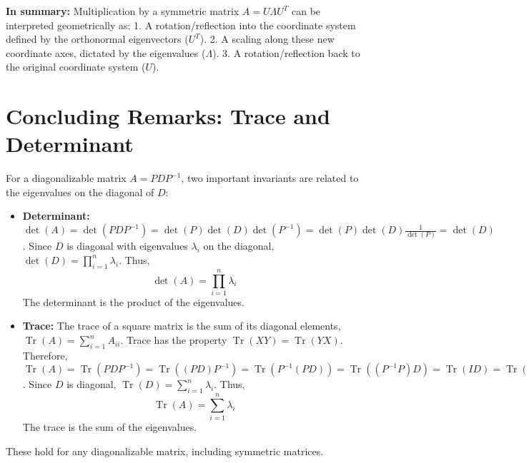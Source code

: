 \documentclass[11pt]{article}
\theoremstyle{definition}
\theoremstyle{remark}
\DeclareMathOperator{\Tr}{Tr}
\begin{document}
\textbf{In summary:} Multiplication by a symmetric matrix $A=U\Lambda U^T$ can be interpreted geometrically as:
1.  A rotation/reflection into the coordinate system defined by the orthonormal eigenvectors ($U^T$).
2.  A scaling along these new coordinate axes, dictated by the eigenvalues ($\Lambda$).
3.  A rotation/reflection back to the original coordinate system ($U$).

\section{Concluding Remarks: Trace and Determinant}

For a diagonalizable matrix $A = P D P^{-1}$, two important invariants are related to the eigenvalues on the diagonal of $D$:

\begin{itemize}
    \item \textbf{Determinant:} $\det(A) = \det(P D P^{-1}) = \det(P) \det(D) \det(P^{-1}) = \det(P) \det(D) \frac{1}{\det(P)} = \det(D)$. Since $D$ is diagonal with eigenvalues $\lambda_i$ on the diagonal, $\det(D) = \prod_{i=1}^n \lambda_i$. Thus,
    \[ \det(A) = \prod_{i=1}^n \lambda_i \]
    The determinant is the product of the eigenvalues.
    \item \textbf{Trace:} The trace of a square matrix is the sum of its diagonal elements, $\Tr(A) = \sum_{i=1}^n A_{ii}$. Trace has the property $\Tr(XY) = \Tr(YX)$. Therefore, $\Tr(A) = \Tr(P D P^{-1}) = \Tr((P D) P^{-1}) = \Tr(P^{-1} (P D)) = \Tr((P^{-1} P) D) = \Tr(I D) = \Tr(D)$. Since $D$ is diagonal, $\Tr(D) = \sum_{i=1}^n \lambda_i$. Thus,
    \[ \Tr(A) = \sum_{i=1}^n \lambda_i \]
    The trace is the sum of the eigenvalues.
\end{itemize}
These hold for any diagonalizable matrix, including symmetric matrices.
\end{document}
